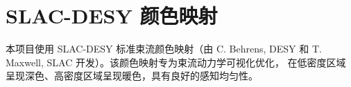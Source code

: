 \documentclass[11pt,a4paper]{article}
\begin{document}

\appendix
\section{SLAC-DESY 颜色映射}

本项目使用 SLAC-DESY 标准束流颜色映射（由 C. Behrens, DESY 和
T. Maxwell, SLAC 开发）。该颜色映射专为束流动力学可视化优化，
在低密度区域呈现深色、高密度区域呈现暖色，具有良好的感知均匀性。
\end{document}
